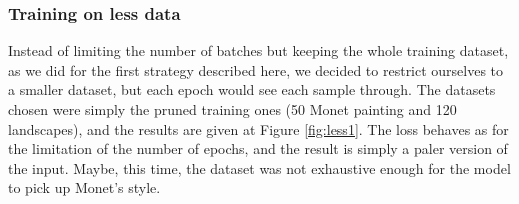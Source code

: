 \documentclass[twocolumn,superscriptaddress,aps,floatfix,nofootinbib]{revtex4-1}
\begin{document}
    \subsubsection{Training on less data}
    
    Instead of limiting the number of batches but keeping the whole training dataset, as we did for the first strategy described here, we decided to restrict ourselves to a smaller dataset, but each epoch would see each sample through. The datasets chosen were simply the pruned training ones (50 Monet painting and 120 landscapes), and the results are given at Figure \ref{fig:less1}. The loss behaves as for the limitation of the number of epochs, and the result is simply a paler version of the input. Maybe, this time, the dataset was not exhaustive enough for the model to pick up Monet's style.
    
\end{document}
